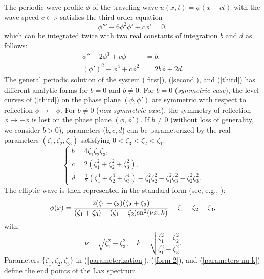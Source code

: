 \documentclass[12pt,reqno]{amsart}
\numberwithin{equation}{section}
\begin{document}
The periodic wave profile $\phi$ of the traveling wave $u(x,t) = \phi(x+ct)$ 
with the wave speed $c \in \mathbb{R}$ satisfies the third-order equation 
\begin{equation}
\label{first}
\phi'''-6\phi^2\phi'+c\phi' = 0,
\end{equation}
which can be integrated twice with two real constants of integration 
$b$ and $d$ as follows:
\begin{align}
\label{second}
\phi'' - 2 \phi^3 + c \phi &= b,  \\
\label{third}
( \phi')^2 - \phi^4 + c\phi^2 &= 2b \phi + 2 d.
\end{align}
The general periodic solution of the system (\ref{first}), (\ref{second}), and (\ref{third}) has different analytic forms for $b = 0$  and $b \neq 0$. 
For $b = 0$ ({\em symmetric case}), the level curves of (\ref{third}) on the phase plane $(\phi,\phi')$ are symmetric with respect to reflection $\phi \to -\phi$. For $b \neq 0$ ({\em non-symmetric case}), the symmetry of reflection $\phi \to -\phi$ is lost on the phase plane $(\phi,\phi')$. If $b \neq 0$ (without loss of generality, we consider $b > 0$), parameters ($b,c,d$) can be parameterized by the real parameters $(\zeta_1,\zeta_2,\zeta_3)$ satisfying $0 < \zeta_3 < \zeta_2 < \zeta_1$:
\begin{equation}
\label{parameterization}
\begin{cases}
b = 4 \zeta_1 \zeta_2 \zeta_3, \\
c = 2(\zeta_1^2 + \zeta_2^2 + \zeta_3^2), \\
d = \frac{1}{2}(\zeta_1^4 + \zeta_2^4 + \zeta_3^4) - \zeta_1^2 \zeta_2^2 - \zeta_1^2 \zeta_3^2 - \zeta_2^2 \zeta_3^2.
\end{cases}
\end{equation}
The elliptic wave is then represented in the standard form 
(see, e.g., \cite{Hoefer}):
\begin{equation}
\label{form-2}
\phi(x) = \dfrac{2 (\zeta_1 + \zeta_3)(\zeta_2 + \zeta_3)}{(\zeta_1 + \zeta_3) -(\zeta_1 - \zeta_2){\rm sn}^2(\nu x,k)} - \zeta_1 - \zeta_2 - \zeta_3,
\end{equation}
with
\begin{equation}
\label{parameters-nu-k}
\nu = \sqrt{\zeta_1^2 - \zeta_3^2},  \quad
k = \sqrt{\dfrac{\zeta_1^2 - \zeta_2^2}{\zeta_1^2 - \zeta_3^2}}.
\end{equation} 
Parameters $\{ \zeta_1,\zeta_2,\zeta_3\}$ in (\ref{parameterization}), (\ref{form-2}), and (\ref{parameters-nu-k}) define the end points of the Lax spectrum 
\end{document}
